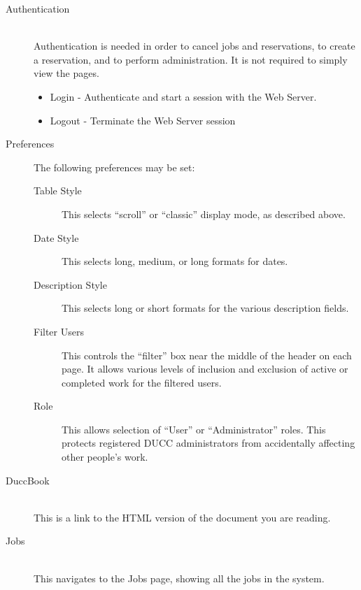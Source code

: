         \begin{description}
          \item[Authentication] \hfill \\ 
            Authentication is needed in order to cancel jobs and reservations, to create a
            reservation, and to perform administration. It is not required to simply view the pages.

            \begin{itemize}
              \item Login - Authenticate and start a session with the Web Server.             
              \item Logout - Terminate the Web Server session 
            \end{itemize}

          \item[Preferences]
            The following preferences may be set:
            \begin{description}
              \item[Table Style] This selects ``scroll'' or ``classic'' display mode, as
                described above.
              \item[Date Style] This selects long, medium, or long formats for dates.
              \item[Description Style] This selects long or short formats for the various
                description fields.
              \item[Filter Users] This controls the ``filter'' box near the middle of
                the header on each page.  It allows various levels of inclusion and
                exclusion of active or completed work for the filtered users.
              \item[Role] This allows selection of ``User'' or ``Administrator'' roles.
                This protects registered DUCC administrators from accidentally affecting
                other people's work.
            \end{description}
            
          \item[DuccBook] \hfill \\
            This is a link to the HTML version of the document you are reading.

          \item[Jobs] \hfill \\
            This navigates to the Jobs page, showing all the jobs in the system.


\end{description}
